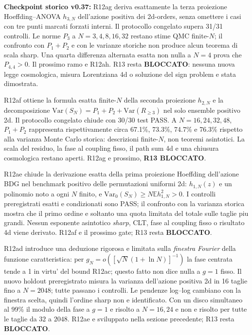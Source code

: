 \documentclass[11pt,a4paper]{article}
\begin{document}
\textbf{Checkpoint storico v0.37:} R12ag deriva esattamente la terza proiezione Hoeffding--ANOVA $h_{3,N}$ dell'azione positiva dei 2d-orders, senza omettere i casi con tre punti marcati forzati interni. Il protocollo congelato supera 31/31 controlli. Le norme $P_3$ a $N=3,4,8,16,32$ restano stime QMC finite-$N$; il confronto con $P_1+P_2$ e con le varianze storiche non produce alcun teorema di scala sharp. Una quarta differenza alternata esatta non nulla a $N=4$ prova che $P_{4,4}>0$. Il prossimo ramo e R12ah. R13 resta \textbf{BLOCCATO}: nessuna nuova legge cosmologica, misura Lorentziana 4d o soluzione del sign problem e stata dimostrata.\par\medskip


R12af ottiene la formula esatta finite-$N$ della seconda proiezione $h_{2,N}$ e la decomposizione $\mathrm{Var}(S_N)=P_1+P_2+\mathrm{Var}(R_{\ge3})$ nel solo ensemble positivo 2d. Il protocollo congelato chiude con 30/30 test PASS. A $N=16,24,32,48$, $P_1+P_2$ rappresenta rispettivamente circa 67.1\%, 73.3\%, 74.7\% e 76.3\% rispetto alla varianza Monte Carlo storica: descrizioni finite-$N$, non teoremi asintotici. La scala del residuo, la fase al coupling fisso, il path sum 4d e una chiusura cosmologica restano aperti. R12ag e prossimo, \textbf{R13 BLOCCATO}.\par\medskip


R12ae chiude la derivazione esatta della prima proiezione Hoeffding dell'azione BDG nel benchmark positivo delle permutazioni uniformi 2d: $h_{1,N}(z)$ e un polinomio noto a ogni $N$ finito, e $\mathrm{Var}_0(S_N)\ge N\mathbb E h_{1,N}^2>0$. I controlli preregistrati esatti e condizionati sono PASS; il confronto con la varianza storica mostra che il primo ordine e soltanto una quota limitata del totale sulle taglie piu grandi. Nessun esponente asintotico \emph{sharp}, CLT, fase al coupling fisso o risultato 4d viene derivato. R12af e il prossimo gate; R13 resta \textbf{BLOCCATO}.\par\medskip


R12ad introduce una deduzione rigorosa e limitata sulla \emph{finestra Fourier} della funzione caratteristica: per $g_N=o([\sqrt N(1+\ln N)]^{-1})$ la fase centrata tende a 1 in virtu' del bound R12ac; questo fatto non dice nulla a $g=1$ fisso. Il nuovo holdout preregistrato misura la varianza dell'azione positiva 2d in 16 taglie fino a $N=2048$; tutte passano i controlli. Le pendenze log--log cambiano con la finestra scelta, quindi l'ordine sharp non e identificato. Con un disco simultaneo al 99\% il modulo della fase a $g=1$ e risolto a $N=16,24$ e non e risolto per tutte le taglie da $32$ a $2048$. R12ae e sviluppato nella sezione precedente; R13 resta \textbf{BLOCCATO}.\par\medskip
\end{document}
